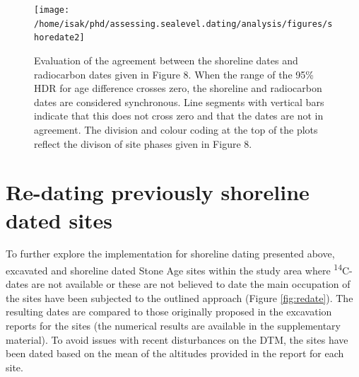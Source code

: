 \documentclass[
]{article}
\begin{document}
\begin{figure}

{\centering \texttt{[image: /home/isak/phd/assessing.sealevel.dating/analysis/figures/shoredate2]} 

}

\caption{Evaluation of the agreement between the shoreline dates and radiocarbon dates given in Figure 8. When the range of the 95\% HDR for age difference crosses zero, the shoreline and radiocarbon dates are considered synchronous. Line segments with vertical bars indicate that this does not cross zero and that the dates are not in agreement.  The division and colour coding at the top of the plots reflect the divison of site phases given in Figure 8.}\label{fig:shoredatediff}
\end{figure}

\hypertarget{re-dating-previously-shoreline-dated-sites}{%
\section{Re-dating previously shoreline dated sites}\label{re-dating-previously-shoreline-dated-sites}}

To further explore the implementation for shoreline dating presented above, excavated and shoreline dated Stone Age sites within the study area where \textsuperscript{14}C-dates are not available or these are not believed to date the main occupation of the sites have been subjected to the outlined approach (Figure \ref{fig:redate}). The resulting dates are compared to those originally proposed in the excavation reports for the sites (the numerical results are available in the supplementary material). To avoid issues with recent disturbances on the DTM, the sites have been dated based on the mean of the altitudes provided in the report for each site.
\end{document}
